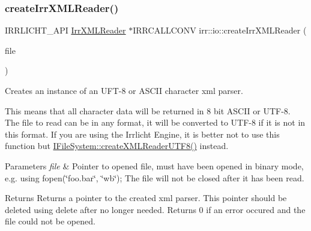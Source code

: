 \subsubsection{\texorpdfstring{create\+Irr\+X\+M\+L\+Reader()}{createIrrXMLReader()}\hspace{0.1cm}{\footnotesize\ttfamily [2/3]}}
{\footnotesize\ttfamily I\+R\+R\+L\+I\+C\+H\+T\+\_\+\+A\+PI \hyperlink{namespaceirr_1_1io_a682f8a2c4c57259bfde1ec8fa27a565b}{Irr\+X\+M\+L\+Reader} $\ast$I\+R\+R\+C\+A\+L\+L\+C\+O\+NV irr\+::io\+::create\+Irr\+X\+M\+L\+Reader (\begin{DoxyParamCaption}\item[{F\+I\+LE $\ast$}]{file }\end{DoxyParamCaption})}



Creates an instance of an U\+F\+T-\/8 or A\+S\+C\+II character xml parser. 

This means that all character data will be returned in 8 bit A\+S\+C\+II or U\+T\+F-\/8. The file to read can be in any format, it will be converted to U\+T\+F-\/8 if it is not in this format. If you are using the Irrlicht Engine, it is better not to use this function but \hyperlink{classirr_1_1io_1_1IFileSystem_affd8f622ac7c3dcd507f20f9cd23b21f}{I\+File\+System\+::create\+X\+M\+L\+Reader\+U\+T\+F8()} instead. 
\begin{DoxyParams}{Parameters}
{\em file} & Pointer to opened file, must have been opened in binary mode, e.\+g. using fopen(\char`\"{}foo.\+bar\char`\"{}, \char`\"{}wb\char`\"{}); The file will not be closed after it has been read. \\
\hline
\end{DoxyParams}
\begin{DoxyReturn}{Returns}
Returns a pointer to the created xml parser. This pointer should be deleted using \textquotesingle{}delete\textquotesingle{} after no longer needed. Returns 0 if an error occured and the file could not be opened. 
\end{DoxyReturn}
\mbox{\label{namespaceirr_1_1io_a1c3b900e1433e2424a7fde667f38d930}} 
